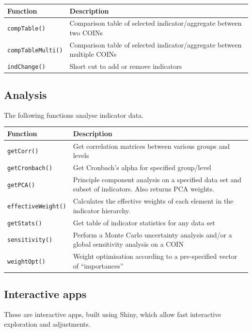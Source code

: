 \documentclass[
]{book}
\begin{document}
\begin{longtable}[]{@{}ll@{}}
\toprule
Function & Description \\
\midrule
\endhead
\texttt{compTable()} & Comparison table of selected indicator/aggregate between two COINs \\
\texttt{compTableMulti()} & Comparison table of selected indicator/aggregate between multiple COINs \\
\texttt{indChange()} & Short cut to add or remove indicators \\
\bottomrule
\end{longtable}

\hypertarget{analysis}{%
\subsection{Analysis}\label{analysis}}

The following functions analyse indicator data.

\begin{longtable}[]{@{}ll@{}}
\toprule
Function & Description \\
\midrule
\endhead
\texttt{getCorr()} & Get correlation matrices between various groups and levels \\
\texttt{getCronbach()} & Get Cronbach's alpha for specified group/level \\
\texttt{getPCA()} & Principle component analysis on a specified data set and subset of indicators. Also returns PCA weights. \\
\texttt{effectiveWeight()} & Calculates the effective weights of each element in the indicator hierarchy. \\
\texttt{getStats()} & Get table of indicator statistics for any data set \\
\texttt{sensitivity()} & Perform a Monte Carlo uncertainty analysis and/or a global sensitivity analysis on a COIN \\
\texttt{weightOpt()} & Weight optimisation according to a pre-specified vector of ``importances'' \\
\bottomrule
\end{longtable}

\hypertarget{interactive-apps}{%
\subsection{Interactive apps}\label{interactive-apps}}

These are interactive apps, built using Shiny, which allow fast interactive exploration and adjustments.
\end{document}

